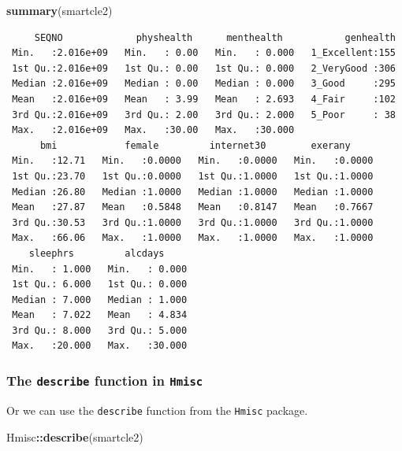 \documentclass[]{book}
\newenvironment{Shaded}{\begin{snugshade}}{\end{snugshade}}
\newcommand{\KeywordTok}[1]{\textcolor[rgb]{0.13,0.29,0.53}{\textbf{#1}}}
\newcommand{\OperatorTok}[1]{\textcolor[rgb]{0.81,0.36,0.00}{\textbf{#1}}}
\newcommand{\NormalTok}[1]{#1}
\theoremstyle{definition}
\theoremstyle{definition}
\theoremstyle{definition}
\theoremstyle{remark}
\begin{document}
\begin{Shaded}
\begin{Highlighting}[]
\KeywordTok{summary}\NormalTok{(smartcle2)}
\end{Highlighting}
\end{Shaded}

\begin{verbatim}
     SEQNO             physhealth      menthealth           genhealth  
 Min.   :2.016e+09   Min.   : 0.00   Min.   : 0.000   1_Excellent:155  
 1st Qu.:2.016e+09   1st Qu.: 0.00   1st Qu.: 0.000   2_VeryGood :306  
 Median :2.016e+09   Median : 0.00   Median : 0.000   3_Good     :295  
 Mean   :2.016e+09   Mean   : 3.99   Mean   : 2.693   4_Fair     :102  
 3rd Qu.:2.016e+09   3rd Qu.: 2.00   3rd Qu.: 2.000   5_Poor     : 38  
 Max.   :2.016e+09   Max.   :30.00   Max.   :30.000                    
      bmi            female         internet30        exerany      
 Min.   :12.71   Min.   :0.0000   Min.   :0.0000   Min.   :0.0000  
 1st Qu.:23.70   1st Qu.:0.0000   1st Qu.:1.0000   1st Qu.:1.0000  
 Median :26.80   Median :1.0000   Median :1.0000   Median :1.0000  
 Mean   :27.87   Mean   :0.5848   Mean   :0.8147   Mean   :0.7667  
 3rd Qu.:30.53   3rd Qu.:1.0000   3rd Qu.:1.0000   3rd Qu.:1.0000  
 Max.   :66.06   Max.   :1.0000   Max.   :1.0000   Max.   :1.0000  
    sleephrs         alcdays      
 Min.   : 1.000   Min.   : 0.000  
 1st Qu.: 6.000   1st Qu.: 0.000  
 Median : 7.000   Median : 1.000  
 Mean   : 7.022   Mean   : 4.834  
 3rd Qu.: 8.000   3rd Qu.: 5.000  
 Max.   :20.000   Max.   :30.000  
\end{verbatim}

\subsubsection{\texorpdfstring{The \texttt{describe} function in
\texttt{Hmisc}}{The describe function in Hmisc}}\label{the-describe-function-in-hmisc}

Or we can use the \texttt{describe} function from the \texttt{Hmisc}
package.

\begin{Shaded}
\begin{Highlighting}[]
\NormalTok{Hmisc}\OperatorTok{::}\KeywordTok{describe}\NormalTok{(smartcle2)}
\end{Highlighting}
\end{Shaded}
\end{document}
